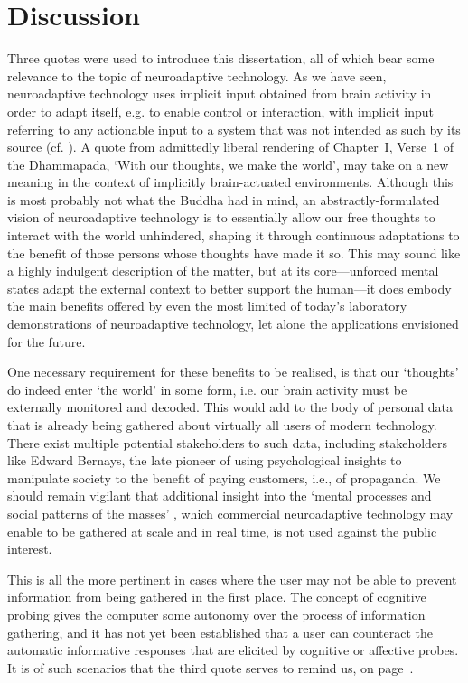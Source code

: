 \cleardoublepage%
%
\chapter*{Discussion}

Three quotes were used to introduce this dissertation, all of which bear some relevance to the topic of neuroadaptive technology. As we have seen, neuroadaptive technology uses implicit input obtained from brain activity in order to adapt itself, e.g. to enable control or interaction, with implicit input referring to any actionable input to a system that was not intended as such by its source (cf. ). A quote from  admittedly liberal rendering of Chapter~I, Verse~1 of the Dhammapada, `With our thoughts, we make the world', may take on a new meaning in the context of implicitly brain-actuated environments. Although this is most probably not what the Buddha had in mind, an abstractly-formulated vision of neuroadaptive technology is to essentially allow our free thoughts to interact with the world unhindered, shaping it through continuous adaptations to the benefit of those persons whose thoughts have made it so. This may sound like a highly indulgent description of the matter, but at its core---unforced mental states adapt the external context to better support the human---it does embody the main benefits offered by even the most limited of today's laboratory demonstrations of neuroadaptive technology, let alone the applications envisioned for the future.

One necessary requirement for these benefits to be realised, is that our `thoughts' do indeed enter `the world' in some form, i.e. our brain activity must be externally monitored and decoded. This would add to the body of personal data that is already being gathered about virtually all users of modern technology. There exist multiple potential stakeholders to such data, including stakeholders like Edward Bernays, the late pioneer of using psychological insights to manipulate society to the benefit of paying customers, i.e., of propaganda. We should remain vigilant that additional insight into the `mental processes and social patterns of the masses' \cite{bernays1928propaganda}, which commercial neuroadaptive technology may enable to be gathered at scale and in real time, is not used against the public interest.

This is all the more pertinent in cases where the user may not be able to prevent information from being gathered in the first place. The concept of cognitive probing gives the computer some autonomy over the process of information gathering, and it has not yet been established that a user can counteract the automatic informative responses that are elicited by cognitive or affective probes. It is of such scenarios that the third quote serves to remind us, on page~\pageref{quote:locutus}.

